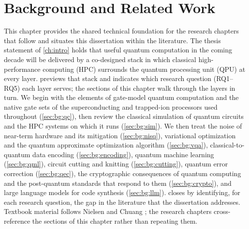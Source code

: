 \chapter{Background and Related Work}\label{ch:background}

This chapter provides the shared technical foundation for the research chapters that follow and situates this dissertation within the literature. The thesis statement of \cref{ch:intro} holds that useful quantum computation in the coming decade will be delivered by a co-designed stack in which classical high-performance computing (HPC) surrounds the quantum processing unit (QPU) at every layer.  previews that stack and indicates which research question (RQ1--RQ5) each layer serves; the sections of this chapter walk through the layers in turn. We begin with the elements of gate-model quantum computation and the native gate sets of the superconducting and trapped-ion processors used throughout (\cref{sec:bg:qc}), then review the classical simulation of quantum circuits and the HPC systems on which it runs (\cref{sec:bg:sim}). We then treat the noise of near-term hardware and its mitigation (\cref{sec:bg:nisq}), variational optimization and the quantum approximate optimization algorithm (\cref{sec:bg:vqa}), classical-to-quantum data encoding (\cref{sec:bg:encoding}), quantum machine learning (\cref{sec:bg:qml}), circuit cutting and knitting (\cref{sec:bg:cutting}), quantum error correction (\cref{sec:bg:qec}), the cryptographic consequences of quantum computing and the post-quantum standards that respond to them (\cref{sec:bg:crypto}), and large language models for code synthesis (\cref{sec:bg:llm}).  closes by identifying, for each research question, the gap in the literature that the dissertation addresses. Textbook material follows Nielsen and Chuang \cite{nielsen2010qcqi}; the research chapters cross-reference the sections of this chapter rather than repeating them.

